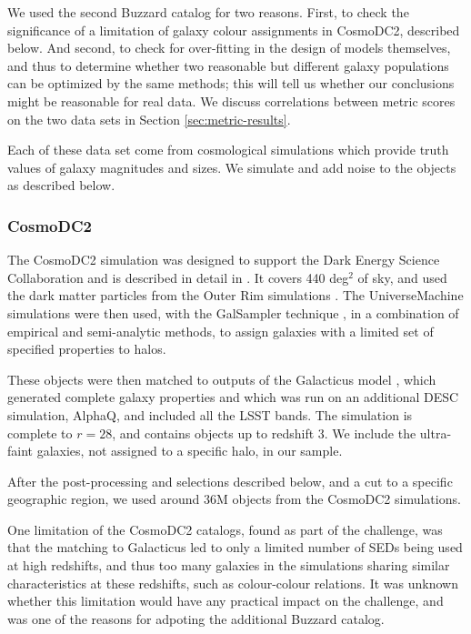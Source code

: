 \documentclass[twocolumn,twocolappendix]{aastex63}
\begin{document}
We used the second Buzzard catalog for two reasons.  First, to check the significance of
a limitation of galaxy colour assignments in CosmoDC2, described below.  And second, to check
for over-fitting in the design of models themselves, and thus to determine whether two
reasonable but different galaxy populations can be optimized by the same methods; this will
tell us whether our conclusions might be reasonable for real data. We discuss correlations
between metric scores on the two data sets in Section \ref{sec:metric-results}.

Each of these data set come from cosmological simulations which provide truth values of galaxy magnitudes
and sizes.  We simulate and add noise to the objects as described below.

\subsubsection{CosmoDC2}

The CosmoDC2 simulation was designed to support the Dark Energy Science
Collaboration and is described in detail in \citet{cosmodc2}.  It covers 440
deg${}^2$ of sky, and used the dark matter particles from the Outer Rim
simulations \citep{outer_rim}.  The UniverseMachine \citep{universe_machine}
simulations were then used, with the GalSampler technique \citep{galsampler},
in a combination of empirical and semi-analytic
methods, to assign galaxies with a limited set of specified properties to halos.

These objects were then matched to outputs of the Galacticus model
\citep{galacticus}, which generated complete galaxy properties and which was run
on an additional DESC simulation, AlphaQ, and included all the LSST bands.  The
simulation is complete to $r=28$, and contains objects up to redshift 3.  We
include the ultra-faint galaxies, not assigned to a specific halo, in our sample.

After the post-processing and selections described below, and a cut to a specific geographic region, 
we used around 36M objects from the CosmoDC2 simulations.

One limitation of the CosmoDC2 catalogs, found as part of the challenge,
was that the matching to Galacticus led to only a limited number of SEDs being
used at high redshifts, and thus too many galaxies in the simulations sharing
similar characteristics at these redshifts, such as colour-colour relations.
It was unknown whether this limitation would have any practical impact on the challenge,
and was one of the reasons for adpoting the additional Buzzard catalog.
\end{document}
